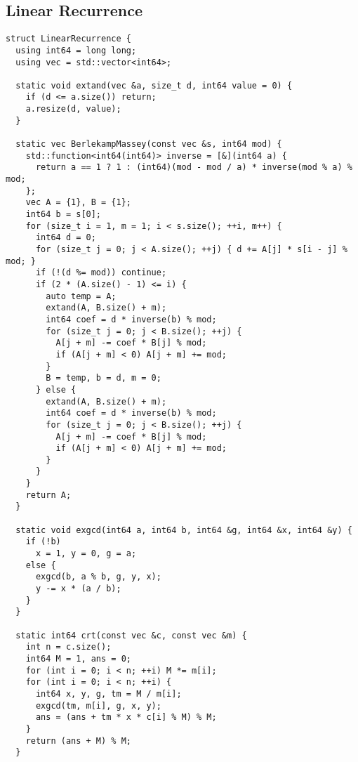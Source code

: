 \documentclass[twoside]{article}
\begin{document}
\subsection{Linear Recurrence}
\begin{lstlisting}
struct LinearRecurrence {
  using int64 = long long;
  using vec = std::vector<int64>;

  static void extand(vec &a, size_t d, int64 value = 0) {
    if (d <= a.size()) return;
    a.resize(d, value);
  }

  static vec BerlekampMassey(const vec &s, int64 mod) {
    std::function<int64(int64)> inverse = [&](int64 a) {
      return a == 1 ? 1 : (int64)(mod - mod / a) * inverse(mod % a) % mod;
    };
    vec A = {1}, B = {1};
    int64 b = s[0];
    for (size_t i = 1, m = 1; i < s.size(); ++i, m++) {
      int64 d = 0;
      for (size_t j = 0; j < A.size(); ++j) { d += A[j] * s[i - j] % mod; }
      if (!(d %= mod)) continue;
      if (2 * (A.size() - 1) <= i) {
        auto temp = A;
        extand(A, B.size() + m);
        int64 coef = d * inverse(b) % mod;
        for (size_t j = 0; j < B.size(); ++j) {
          A[j + m] -= coef * B[j] % mod;
          if (A[j + m] < 0) A[j + m] += mod;
        }
        B = temp, b = d, m = 0;
      } else {
        extand(A, B.size() + m);
        int64 coef = d * inverse(b) % mod;
        for (size_t j = 0; j < B.size(); ++j) {
          A[j + m] -= coef * B[j] % mod;
          if (A[j + m] < 0) A[j + m] += mod;
        }
      }
    }
    return A;
  }

  static void exgcd(int64 a, int64 b, int64 &g, int64 &x, int64 &y) {
    if (!b)
      x = 1, y = 0, g = a;
    else {
      exgcd(b, a % b, g, y, x);
      y -= x * (a / b);
    }
  }

  static int64 crt(const vec &c, const vec &m) {
    int n = c.size();
    int64 M = 1, ans = 0;
    for (int i = 0; i < n; ++i) M *= m[i];
    for (int i = 0; i < n; ++i) {
      int64 x, y, g, tm = M / m[i];
      exgcd(tm, m[i], g, x, y);
      ans = (ans + tm * x * c[i] % M) % M;
    }
    return (ans + M) % M;
  }


\end{lstlisting}
\end{document}
